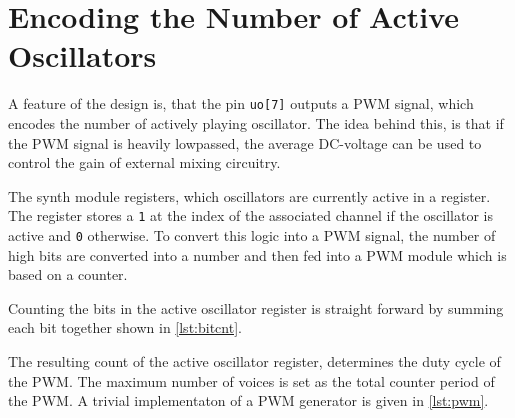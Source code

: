 \newpage
\section{Encoding the Number of Active Oscillators}

A feature of the design is, that the pin \texttt{uo[7]} outputs a PWM signal, which encodes the number of actively playing oscillator. The idea behind this, is that if the PWM signal is heavily lowpassed, the average DC-voltage can be used to control the gain of external mixing circuitry.

The synth module registers, which oscillators are currently active in a register. The register stores a \lstinline!1! at the index of the associated channel if the oscillator is active and \lstinline!0! otherwise. To convert this logic into a PWM signal, the number of high bits are converted into a number and then fed into a PWM module which is based on a counter.

Counting the bits in the active oscillator register is straight forward by summing each bit together shown in \autoref{lst:bitcnt}.



The resulting count of the active oscillator register, determines the duty cycle of the \acs{PWM}. The maximum number of voices is set as the total counter period of the \acs{PWM}. A trivial implementaton of a \acs{PWM} generator is given in \autoref{lst:pwm}.

\newpage


